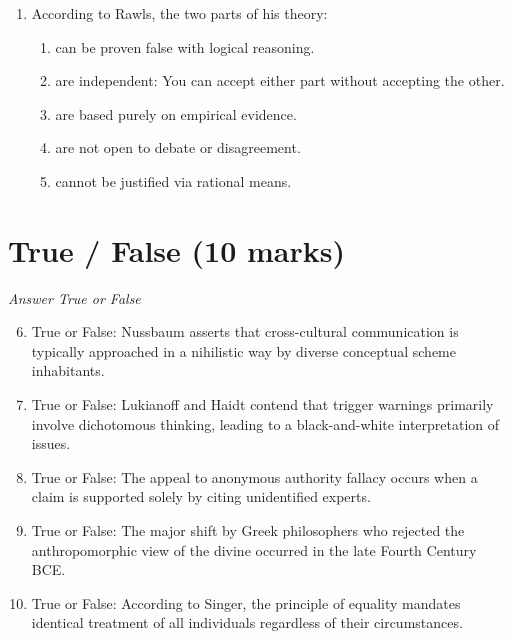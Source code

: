 \documentclass[12pt]{article}
\begin{document}
\begin{enumerate}[label=\arabic*.]
\begin{enumerate}[label=(\alph*)]
    \item a way to measure the value of an action's consequences.
    \item a criterion for social acceptability.
    \item a protocol for interpersonal communication.
\end{enumerate}
\item According to Rawls, the two parts of his theory:
\begin{enumerate}[label=(\alph*)]
    \item can be proven false with logical reasoning.
    \item are independent: You can accept either part without accepting the other.
    \item are based purely on empirical evidence.
    \item are not open to debate or disagreement.
    \item cannot be justified via rational means.
\end{enumerate}
\end{enumerate}

\section*{True / False (10 marks)}
\textit{Answer True or False}
\begin{enumerate}[label=\arabic*.]
\setcounter{enumi}{5}
\item True or False: Nussbaum asserts that cross-cultural communication is typically approached in a nihilistic way by diverse conceptual scheme inhabitants.
\item True or False: Lukianoff and Haidt contend that trigger warnings primarily involve dichotomous thinking, leading to a black-and-white interpretation of issues.
\item True or False: The appeal to anonymous authority fallacy occurs when a claim is supported solely by citing unidentified experts.
\item True or False: The major shift by Greek philosophers who rejected the anthropomorphic view of the divine occurred in the late Fourth Century BCE.
\item True or False: According to Singer, the principle of equality mandates identical treatment of all individuals regardless of their circumstances.
\end{enumerate}
\end{document}
